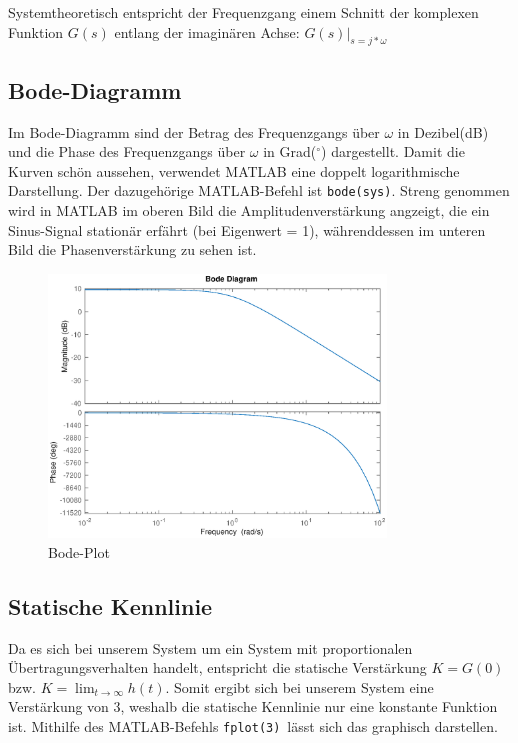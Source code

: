  Systemtheoretisch entspricht der Frequenzgang einem Schnitt der komplexen Funktion $G(s)$ entlang der imaginären Achse: $G(s)\Bigr\rvert_{s = j * \omega}$

\subsection{Bode-Diagramm}
Im Bode-Diagramm sind der Betrag des Frequenzgangs über $\omega$ in Dezibel(dB) und die Phase des Frequenzgangs über $\omega$ in Grad($^\circ$) dargestellt. Damit die Kurven schön aussehen, verwendet MATLAB eine doppelt logarithmische Darstellung. Der dazugehörige MATLAB-Befehl ist \texttt{bode(sys)}. Streng genommen wird in MATLAB im oberen Bild die Amplitudenverstärkung angzeigt, die ein Sinus-Signal stationär erfährt (bei Eigenwert = 1), währenddessen im unteren Bild die Phasenverstärkung zu sehen ist.

\begin{figure}[H]
    \label{fig:bode}
    \centering
    \includegraphics[width=0.8\textwidth]{Bilder/BodePT1Tt.eps}
    \caption{Bode-Plot}
 \end{figure}

\subsection{Statische Kennlinie}
Da es sich bei unserem System um ein System mit proportionalen Übertragungsverhalten handelt, entspricht die statische Verstärkung $K = G(0)$ bzw. $K = \lim_{t\to \infty} h(t)$. Somit ergibt sich bei unserem System eine Verstärkung von 3, weshalb die statische Kennlinie nur eine konstante Funktion ist. Mithilfe des MATLAB-Befehls \texttt{fplot(3)} lässt sich das graphisch darstellen. 


